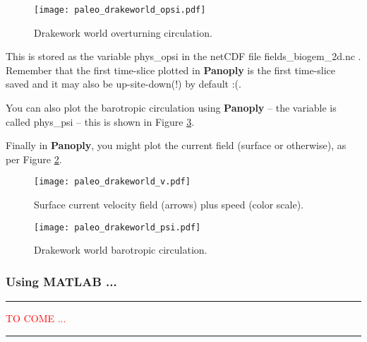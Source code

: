 \documentclass[11pt,fleqn]{book} %
\begin{document}
\begin{figure}
\texttt{[image: paleo\_drakeworld\_opsi.pdf]}\centering
\vspace{-6mm}
\caption{Drakework world overturning circulation.}
\label{fig:paleo_drakeworld.opsi}
\end{figure}

This is stored as the variable \small\textsf{phys\_opsi }\normalsize in the netCDF file \small\textsf{fields\_biogem\_2d.nc }\normalsize. Remember that the first time-slice plotted in \textbf{Panoply} is the first time-slice saved and it may also be up-site-down(!) by default :(.

You can also plot the barotropic circulation using \textbf{Panoply} -- the variable is called \small\textsf{phys\_psi }\normalsize -- this is shown in Figure \ref{fig:paleo_drakeworld.psi}.

Finally in \textbf{Panoply}, you might plot the current field (surface or otherwise), as per Figure \ref{fig:paleo_drakeworld.v}.

\begin{figure}
\texttt{[image: paleo\_drakeworld\_v.pdf]}\centering
\vspace{-6mm}
\caption{Surface current velocity field (arrows) plus speed (color scale).}
\label{fig:paleo_drakeworld.v}
\end{figure}
  
\begin{figure}
\texttt{[image: paleo\_drakeworld\_psi.pdf]}\centering
\vspace{-6mm}
\caption{Drakework world barotropic circulation.}
\label{fig:paleo_drakeworld.psi}
\end{figure}


\subsubsection{Using MATLAB ...}

\vspace{1mm}
\noindent\rule{4cm}{0.5pt}
\vspace{2mm}

\noindent\textcolor{red}{TO COME ...}

\vspace{1mm}
\noindent\rule{4cm}{0.5pt}
\vspace{2mm}

\end{document}
